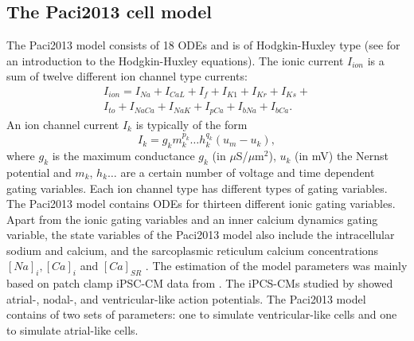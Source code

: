 \documentclass[12pt,a4paper]{article}
\begin{document}
\subsection{The Paci2013 cell model} \label{The Paci2013 cell model}
The Paci2013 model consists of 18 ODEs and is of Hodgkin-Huxley type (see \cite[p. 195-215]{KeenerI} for an introduction to the Hodgkin-Huxley equations). The ionic current $I_{ion}$ is a sum of twelve different ion channel type currents:
\begin{eqnarray}
I_{ion}=I_{Na}+I_{CaL}+I_f+I_{K1}+I_{Kr}+I_{Ks}+ \\
I_{to}+I_{NaCa}+I_{NaK}+I_{pCa}+I_{bNa}+I_{bCa}.
\end{eqnarray}
An ion channel current $I_k$ is typically of the form 
\begin{equation}
I_{k}=g_k m_k^{p_k}\ldots h_k^{q_k}(u_m-u_k),
\end{equation}
where $g_k$ is the maximum conductance $g_k$ (in $\mu$S/$\mu$m$^2$), $u_k$ (in mV) the Nernst potential and $m_k$, $h_k \ldots$ are a certain number of voltage and time dependent gating variables. Each ion channel type has different types of gating variables. The Paci2013 model contains ODEs for thirteen different ionic gating variables. Apart from the ionic gating variables and an inner calcium dynamics gating variable, the state variables of the Paci2013 model also include the intracellular sodium and calcium, and the sarcoplasmic reticulum calcium concentrations $[Na]_i, [Ca]_i$ and $[Ca]_{SR}$ \cite{Paci2013}. The estimation of the model parameters was mainly based on patch clamp iPSC-CM data from \cite{Ma2011}. The iPCS-CMs studied by \cite{Ma2011} showed atrial-, nodal-, and ventricular-like action potentials. The Paci2013 model contains of two sets of parameters: one to simulate ventricular-like cells and one to simulate atrial-like cells. 

%
\end{document}

